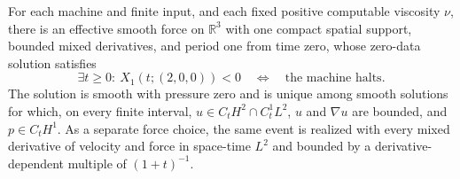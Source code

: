 \begin{theorem}
\label{ba:periodic-entry}
For each machine and finite input, and each fixed positive computable
viscosity $\nu$, there is an effective smooth force on $\mathbb R^3$
with one compact spatial support, bounded mixed derivatives, and period
one from time zero, whose zero-data solution satisfies
\[
 \exists t\ge0:\ X_1(t;(2,0,0))<0
 \quad\Longleftrightarrow\quad\text{the machine halts}.
\]
The solution is smooth with pressure zero and is unique among smooth
solutions for which, on every finite interval,
$u\in C_tH^2\cap C_t^1L^2$, $u$ and $\nabla u$ are bounded, and
$p\in C_tH^1$.
As a separate force choice, the same event is realized with every
mixed derivative of velocity and force in space-time $L^2$ and bounded
by a derivative-dependent multiple of $(1+t)^{-1}$.
\end{theorem}

